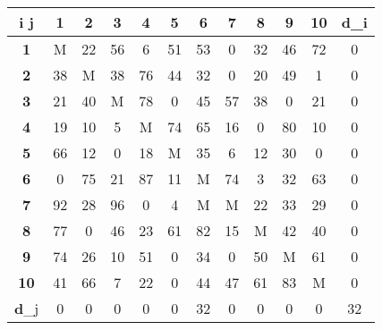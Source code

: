 \documentclass[17pt]{extarticle}
\begin{document}
\begin{table}[H]
    \centering
    \begin{tabular}{|c|c|c|c|c|c|c|c|c|c|c|c|}
        \hline
        \textbf{i j} & \textbf{1} & \textbf{2} & \textbf{3} & \textbf{4} & \textbf{5} & \textbf{6} & \textbf{7} & \textbf{8} & \textbf{9} & \textbf{10} & \textbf{d}_i \\ \hline
        \textbf{1}   & M          & 22         & 56         & 6          & 51         & 53         & 0          & 32         & 46         & 72          & 0            \\ \hline
        \textbf{2}   & 38         & M          & 38         & 76         & 44         & 32         & 0          & 20         & 49         & 1           & 0            \\ \hline
        \textbf{3}   & 21         & 40         & M          & 78         & 0          & 45         & 57         & 38         & 0          & 21          & 0            \\ \hline
        \textbf{4}   & 19         & 10         & 5          & M          & 74         & 65         & 16         & 0          & 80         & 10          & 0            \\ \hline
        \textbf{5}   & 66         & 12         & 0          & 18         & M          & 35         & 6          & 12         & 30         & 0           & 0            \\ \hline
        \textbf{6}   & 0          & 75         & 21         & 87         & 11         & M          & 74         & 3          & 32         & 63          & 0            \\ \hline
        \textbf{7}   & 92         & 28         & 96         & 0          & 4          & M          & M          & 22         & 33         & 29          & 0            \\ \hline
        \textbf{8}   & 77         & 0          & 46         & 23         & 61         & 82         & 15         & M          & 42         & 40          & 0            \\ \hline
        \textbf{9}   & 74         & 26         & 10         & 51         & 0          & 34         & 0          & 50         & M          & 61          & 0            \\ \hline
        \textbf{10}  & 41         & 66         & 7          & 22         & 0          & 44         & 47         & 61         & 83         & M           & 0            \\ \hline
        \textbf{d}_j & 0          & 0          & 0          & 0          & 0          & 32         & 0          & 0          & 0          & 0           & 32           \\ \hline
    \end{tabular}
\end{table}
\end{document}

